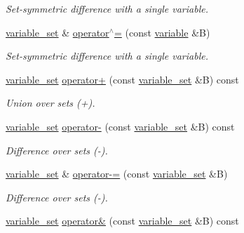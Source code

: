 \begin{DoxyCompactItemize}
\begin{DoxyCompactList}\small\item\em Set-\/symmetric difference with a single variable. \end{DoxyCompactList}\item 
\hypertarget{classmerlin_1_1variable__set_a19f5514dc23cb08df616cc6c69d17bb6}{}\hyperlink{classmerlin_1_1variable__set}{variable\+\_\+set} \& \hyperlink{classmerlin_1_1variable__set_a19f5514dc23cb08df616cc6c69d17bb6}{operator$^\wedge$=} (const \hyperlink{classmerlin_1_1variable}{variable} \&B)\label{classmerlin_1_1variable__set_a19f5514dc23cb08df616cc6c69d17bb6}

\begin{DoxyCompactList}\small\item\em Set-\/symmetric difference with a single variable. \end{DoxyCompactList}\item 
\hyperlink{classmerlin_1_1variable__set}{variable\+\_\+set} \hyperlink{classmerlin_1_1variable__set_a7209d8b38f3d0bc6316a2176d13a3a67}{operator+} (const \hyperlink{classmerlin_1_1variable__set}{variable\+\_\+set} \&B) const 
\begin{DoxyCompactList}\small\item\em Union over sets (+). \end{DoxyCompactList}\item 
\hyperlink{classmerlin_1_1variable__set}{variable\+\_\+set} \hyperlink{classmerlin_1_1variable__set_adf98eb40282f9c84c04188bb78471a86}{operator-\/} (const \hyperlink{classmerlin_1_1variable__set}{variable\+\_\+set} \&B) const 
\begin{DoxyCompactList}\small\item\em Difference over sets (-\/). \end{DoxyCompactList}\item 
\hyperlink{classmerlin_1_1variable__set}{variable\+\_\+set} \& \hyperlink{classmerlin_1_1variable__set_ab58724a10896f29669575024636a4914}{operator-\/=} (const \hyperlink{classmerlin_1_1variable__set}{variable\+\_\+set} \&B)
\begin{DoxyCompactList}\small\item\em Difference over sets (-\/). \end{DoxyCompactList}\item 
\hyperlink{classmerlin_1_1variable__set}{variable\+\_\+set} \hyperlink{classmerlin_1_1variable__set_a6712399404c2a13376f65b60e1d86466}{operator\&} (const \hyperlink{classmerlin_1_1variable__set}{variable\+\_\+set} \&B) const 

\end{DoxyCompactItemize}
